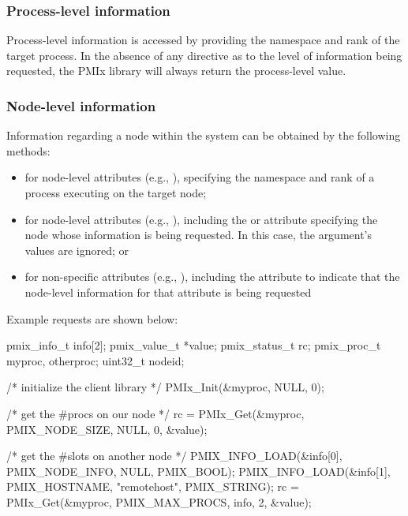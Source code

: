 \subsubsection{Process-level information}

Process-level information is accessed by providing the namespace and rank of the target process. In the absence of any directive as to the level of information being requested, the \ac{PMIx} library will always return the process-level value.

\subsubsection{Node-level information}

Information regarding a node within the system can be obtained by the following methods:

\begin{itemize}
\item for node-level attributes (e.g., ), specifying the namespace and rank of a process executing on the target node;
\item for node-level attributes (e.g., ), including the  or  attribute specifying the node whose information is being requested. In this case, the  argument's values are ignored; or
\item for non-specific attributes (e.g., ), including the  attribute to indicate that the node-level information for that attribute is being requested
\end{itemize}

Example requests are shown below:

\cspecificstart
\begin{codepar}
pmix_info_t info[2];
pmix_value_t *value;
pmix_status_t rc;
pmix_proc_t myproc, otherproc;
uint32_t nodeid;

/* initialize the client library */
PMIx_Init(&myproc, NULL, 0);

/* get the #procs on our node */
rc = PMIx_Get(&myproc, PMIX_NODE_SIZE, NULL, 0, &value);

/* get the #slots on another node */
PMIX_INFO_LOAD(&info[0], PMIX_NODE_INFO, NULL, PMIX_BOOL);
PMIX_INFO_LOAD(&info[1], PMIX_HOSTNAME, "remotehost", PMIX_STRING);
rc = PMIx_Get(&myproc, PMIX_MAX_PROCS, info, 2, &value);

\end{codepar}
\cspecificend

